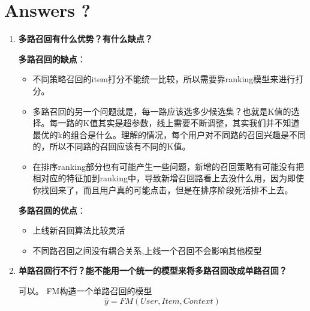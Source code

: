 \documentclass{article}
\begin{document}
\begin{CJK*}{UTF8}{gbsn}
\begin{itemize}
\end{itemize}


\section{Answers ?}
\begin{enumerate}
\item \textbf{ 多路召回有什么优势？有什么缺点？}

\textbf{多路召回的缺点}：
\begin{itemize}
\item 不同策略召回的item打分不能统一比较，所以需要靠ranking模型来进行打分。
\item 多路召回的另一个问题就是，每一路应该选多少候选集？也就是K值的选择。每一路的K值其实是超参数，线上需要不断调整，其实我们并不知道最优的k的组合是什么。理解的情况，每个用户对不同路的召回兴趣是不同的，所以不同路的召回应该有不同的K值。
\item 在排序ranking部分也有可能产生一些问题，新增的召回策略有可能没有把相对应的特征加到ranking中，导致新增召回路看上去没什么用，因为即使你找回来了，而且用户真的可能点击，但是在排序阶段死活排不上去。
\end{itemize}

\textbf{多路召回的优点}：
\begin{itemize}
\item 上线新召回算法比较灵活
\item 不同路召回之间没有耦合关系,上线一个召回不会影响其他模型
\end{itemize}

\item \textbf{ 单路召回行不行？能不能用一个统一的模型来将多路召回改成单路召回？}

可以。 FM构造一个单路召回的模型
$$\widehat{y}=FM(User,Item,Context)$$


\end{enumerate}
\end{CJK*}
\end{document}
